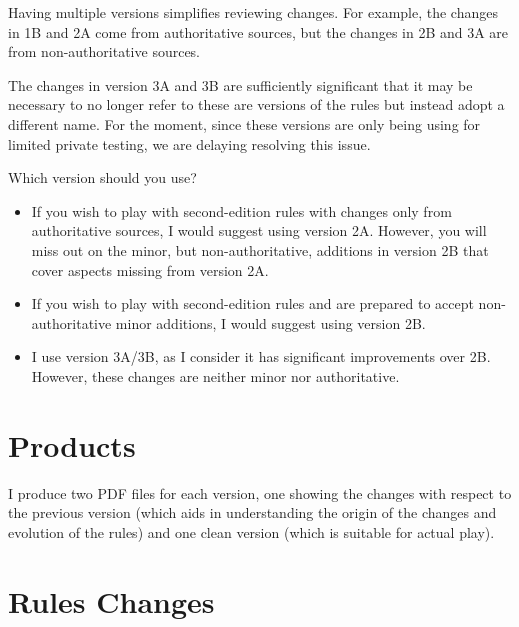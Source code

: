 \documentclass[10pt]{report}
\begin{document}
Having multiple versions simplifies reviewing changes. For example, the changes in 1B and 2A come from authoritative sources, but the changes in 2B and 3A are from non-authoritative sources.

The changes in version 3A and 3B are sufficiently significant that it may be necessary to no longer refer to these are versions of the {\AirPow} rules but instead adopt a different name. For the moment, since these versions are only being using for limited private testing, we are delaying resolving this issue.

Which version should you use?

\begin{itemize}
    \item If you wish to play with second-edition rules with changes only from authoritative sources, I would suggest using version 2A. However, you will miss out on the minor, but non-authoritative, additions in version 2B that cover aspects missing from version 2A.
    \item If you wish to play with second-edition rules and are prepared to accept non-authoritative minor additions, I would suggest using version 2B.
    \item I use version 3A/3B, as I consider it has significant improvements over 2B. However, these changes are neither minor nor authoritative.
\end{itemize}    

\section{Products}

I produce two PDF files for each version, one showing the changes with respect to the previous version (which aids in understanding the origin of the changes and evolution of the rules) and one clean version (which is suitable for actual play).



\section{Rules Changes}
\end{document}
